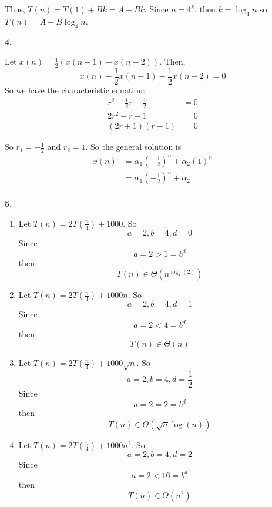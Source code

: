 \documentclass[letterpaper, 11pt]{article}
\newcommand{\hwnumber}[1]{\medskip \noindent\textbf{#1.} \smallskip}
\begin{document}
Thus, \(T(n) = T(1) + Bk = A + Bk\). Since \(n = 4^k\), then \(k = \log_4 n\)
so \(T(n) = A + B\log_4 n\).

\hwnumber{4}

Let \(x(n) = \frac{1}{2}(x(n - 1) + x(n - 2))\). Then,
\[x(n) - \frac{1}{2}x(n - 1) - \frac{1}{2}x(n - 2) = 0\]
So we have the characteristic equation:
\begin{align*}
  r^2 - \frac{1}{2}r - \frac{1}{2} &= 0\\
  2r^2 - r - 1 &= 0 \\
  (2r + 1)(r - 1) &= 0
\end{align*}

So \(r_1 = -\frac{1}{2}\) and \(r_2 = 1\). So the general solution is 
\begin{align*}
  x(n) &= \alpha_1 \left(-\frac{1}{2}\right)^n + \alpha_2(1)^n\\
       &= \alpha_1 \left(-\frac{1}{2}\right)^n + \alpha_2\\
\end{align*}

\newpage
\hwnumber{5}

\begin{enumerate}[label = (\alph*)]
  \item Let \(T(n) = 2T(\frac{n}{4}) + 1000\). So 
    \[a = 2, b = 4, d = 0\]
    Since 
    \[a = 2 > 1 = b^d\]
    then 
    \[T(n) \in \Theta\left(n^{\log_4(2)}\right)\]
  \item Let \(T(n) = 2T(\frac{n}{4}) + 1000n\). So 
    \[a = 2, b = 4, d = 1\]
    Since 
    \[a = 2 < 4 = b^d\]
    then 
    \[T(n) \in \Theta(n)\]
  \item Let \(T(n) = 2T(\frac{n}{4}) + 1000\sqrt{n}\). So 
    \[a = 2, b = 4, d = \frac{1}{2}\]
    Since 
    \[a = 2 = 2 = b^d\]
    then 
    \[T(n) \in \Theta\left(\sqrt{n}\log(n)\right)\]
  \item Let \(T(n) = 2T(\frac{n}{4}) + 1000n^2\). So 
    \[a = 2, b = 4, d = 2\]
    Since 
    \[a = 2 < 16 = b^d\]
    then 
    \[T(n) \in \Theta\left(n^2\right)\]
\end{enumerate}
\end{document}
